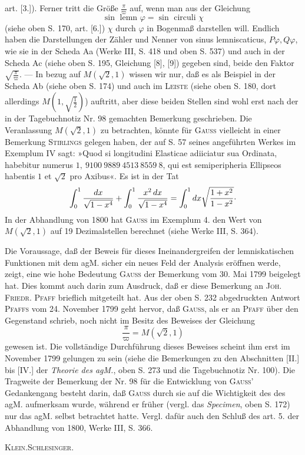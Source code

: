 \clearpage{}
\begingroup\small
\noindent art. [3.]). Ferner tritt die Größe \(\frac\pi\varpi\) auf, wenn man aus der Gleichung
\[
\sin\text{ lemn }\varphi=\sin\text{ circuli }\chi
\]
\noindent (siehe oben S. 170, art. [6.]) \(\chi\) durch \(\varphi\) in Bogenmaß darstellen will. Endlich haben die Darstellungen der Zähler und Nenner von sinus lemniscaticus, \(P\varphi,Q\varphi\), wie sie in der Scheda Aa (Werke III, S. 418 und oben S. 537) und auch in der Scheda Ac (siehe oben S. 195, Gleichung [8], [9]) gegeben sind, beide den Faktor \(\sqrt{\frac\pi\varpi}\). — In bezug auf \(M(\sqrt2,1)\) wissen wir nur, daß es als Beispiel in der Scheda Ab (siehe oben S. 174) und auch im \textsc{Leiste} (siehe oben S. 180, dort allerdings \(M(1,\sqrt{\frac12})\)) auftritt, aber diese beiden Stellen sind wohl erst nach der in der Tagebuchnotiz Nr. 98 gemachten Bemerkung geschrieben. Die Veranlassung \(M(\sqrt2,1)\) zu betrachten, könnte für \textsc{Gauss} vielleicht in einer Bemerkung \textsc{Stirlings} gelegen haben, der auf S. 57 seines angeführten Werkes im Exemplum IV sagt: »Quod si longitudini Elasticae adiiciatur sua Ordinata, habebitur numerus \(1{,}\ 9100\ 9889\ 4513\ 8559\ 8\), qui est semiperipheria Ellipseos habentis \(1\) et \(\sqrt2\) pro Axibus«. Es ist in der Tat
\[
\int_0^1\frac{dx}{\sqrt{1-x^4}}+\int_0^1\frac{x^2\,dx}{\sqrt{1-x^4}}=\int_0^1 dx\sqrt{\frac{1+x^2}{1-x^2}}\mathpunct{\raisebox{.35ex}{.}}
\]
\noindent In der Abhandlung von 1800 hat \textsc{Gauss} im Exemplum 4. den Wert von \(M(\sqrt2,1)\) auf 19 Dezimalstellen berechnet (siehe Werke III, S. 364).

\indent Die Voraussage, daß der Beweis für dieses Ineinandergreifen der lemniskatischen Funktionen mit dem agM. sicher ein neues Feld der Analysis eröffnen werde, zeigt, eine wie hohe Bedeutung \textsc{Gauss} der Bemerkung vom 30. Mai 1799 beigelegt hat. Dies kommt auch darin zum Ausdruck, daß er diese Bemerkung an \textsc{Joh. Friedr. Pfaff} brieflich mitgeteilt hat. Aus der oben S. 232 abgedruckten Antwort \textsc{Pfaffs} vom 24. November 1799 geht hervor, daß \textsc{Gauss}, als er an \textsc{Pfaff} über den Gegenstand schrieb, noch nicht im Besitz des Beweises der Gleichung
\[
\frac\pi\varpi=M(\sqrt2,1)
\]
\noindent gewesen ist. Die vollständige Durchführung dieses Beweises scheint ihm erst im November 1799 gelungen zu sein (siehe die Bemerkungen zu den Abschnitten [II.] bis [IV.] der \textit{Theorie des agM.}, oben S. 273 und die Tagebuchnotiz Nr. 100). Die Tragweite der Bemerkung der Nr. 98 für die Entwicklung von \textsc{Gauss}’ Gedankengang besteht darin, daß \textsc{Gauss} durch sie auf die Wichtigkeit des  des agM. aufmerksam wurde, während er früher (vergl. das \textit{Specimen}, oben S. 172) nur das agM. selbst betrachtet hatte. Vergl. dafür auch den Schluß des art. 5. der Abhandlung von 1800, Werke III, S. 366.
\par\noindent\hfill\textsc{Klein.\quad Schlesinger.}
\par\endgroup
